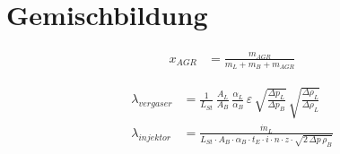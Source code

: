 \documentclass[english,threecolumn,color]{latex4ei/latex4ei_sheet}
\begin{document}
\section{Gemischbildung}
\begin{sectionbox}
	\begin{align*}
		x_{AGR}&=\frac{m_{AGR}}{m_L+m_B+m_{AGR}}
	\end{align*}

	\begin{align*}
		\lambda_{vergaser}&=\frac{1}{L_{St}} \, \frac{A_L}{A_B} \, \frac{\alpha_L}{\alpha_B}\, \varepsilon \, \sqrt{\frac{\varDelta p_L}{\varDelta p_B}} \, \sqrt{\frac{\varDelta \rho_L}{\varDelta \rho_L}}\\
		\lambda_{injektor} &= \frac{\dot{m}_L}{L_{St}\cdot A_B \cdot \alpha_B \cdot t_E \cdot i \cdot n \cdot z \cdot \sqrt{2 \, \varDelta p \, \rho_B}}
	\end{align*}
\end{sectionbox}

\end{document}
